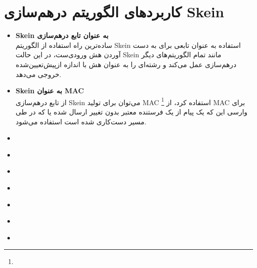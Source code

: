 \section{کاربردهای الگوریتم درهم‌سازی Skein}
\begin{itemize}
	
	\item \textbf{Skein به عنوان تابع درهم‌سازی}\\
	      ساده‌ترین راه استفاده از الگوریتم Skein استفاده به عنوان تابعی برای به دست آوردن هش ورودی‌ست، در این حالت Skein مانند تمام الگوریتم‌های دیگر درهم‌سازی عمل می‌کند و رشته‌ای را به عنوان هش با اندازه ازپیش‌تعیین‌شده خروجی می‌دهد.
	\item \textbf{Skein به عنوان MAC}\\
	      از تابع درهم‌سازی Skein می‌توان برای تولید MAC
	      \footnote{}
	      استفاده کرد، از 
	      MAC 
	      برای وارسی این که یک پیام از یک فرستنده معتبر بدون تغییر ارسال شده یا که در طی مسیر دست‌کاری شده است استفاده می‌شود. 
	\item {}
	\item \textbf{}
	\item \textbf{}
	\item \textbf{}
	\item \textbf{}
	\item \textbf{}
	\item \textbf{}
\end{itemize}
\begin{thebibliography}{1}
	
	
	  
	
	  
	
	
\end{thebibliography}